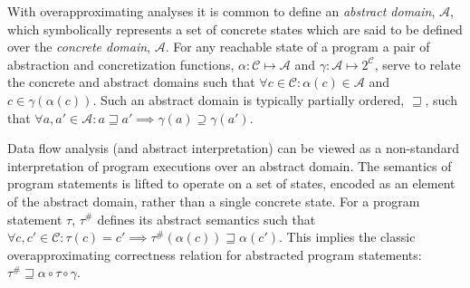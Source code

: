 With overapproximating analyses it is common to define an \textit{abstract
domain}, $\mathcal{A}$, 
which symbolically represents a set of concrete states which 
are said to be defined over the \textit{concrete domain}, $\mathcal{A}$.
For any reachable state of a program a pair of abstraction 
and concretization functions, 
$\alpha : \mathcal{C} \mapsto \mathcal{A}$ and  
$\gamma : \mathcal{A} \mapsto 2^\mathcal{C}$,
serve to relate the concrete and abstract domains such that 
$\forall c \in \mathcal{C} : \alpha(c) \in \mathcal{A}$ and $c \in \gamma(\alpha(c))$.
Such an abstract domain is typically partially ordered, $\sqsupseteq$,
such that 
$\forall a,a' \in \mathcal{A} :  a \sqsupseteq a' \implies \gamma(a) \supseteq \gamma(a')$.

Data flow analysis (and abstract interpretation) can be viewed as a
non-standard interpretation of program executions over an abstract
domain.  The semantics of program statements is lifted to operate
on a set of states, encoded as an element of the abstract domain,
rather than a single concrete state.  For a program statement $\tau$,
$\tau^\#$ defines its abstract semantics such that
$\forall c, c' \in \mathcal{C} : \tau(c) = c' \implies \tau^\#(\alpha(c)) \sqsupseteq \alpha(c')$.  This implies the classic overapproximating correctness
relation for abstracted program statements:
$\tau^\# \sqsupseteq \alpha \circ \tau \circ \gamma$.




